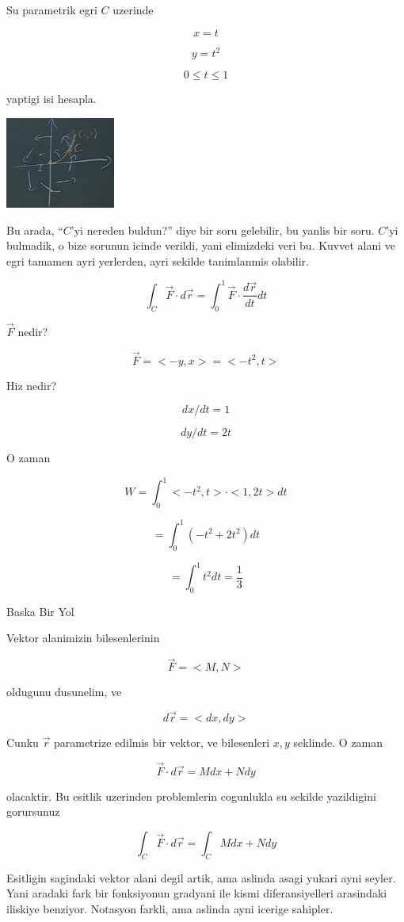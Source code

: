 \documentclass[12pt,fleqn]{article}\usepackage{../common}
\begin{document}
Su parametrik egri $C$ uzerinde

\[ x = t  \]

\[ y = t^2 \]

\[ 0 \le t \le 1 \]

yaptigi isi hesapla. 

\includegraphics[height=3cm]{19_10.png}

Bu arada, ``$C$'yi nereden buldun?'' diye bir soru gelebilir, bu yanlis bir
soru. $C$'yi bulmadik, o bize sorunun icinde verildi, yani elimizdeki veri
bu. Kuvvet alani ve egri tamamen ayri yerlerden, ayri sekilde tanimlanmis
olabilir. 

\[ \int_C \vec{F} \cdot d\vec{r} 
= \int_{0}^{1} \vec{F} \cdot \frac{d\vec{r}}{dt} dt 
\]

$\vec{F}$ nedir? 

\[ \vec{F} = <-y,x> = <-t^2,t> \]

Hiz nedir? 

\[ dx/dt = 1 \]

\[ dy/dt = 2t \]

O zaman 

\[ W = \int_{0}^{1}  <-t^2,t>\cdot<1,2t>dt \]

\[ = \int_{0}^{1} (-t^2 + 2t^2)dt\]

\[ = \int_{0}^{1} t^2dt = \frac{1}{3} \]


Baska Bir Yol

Vektor alanimizin bilesenlerinin

\[ \vec{F} = <M,N> \]

oldugunu dusunelim, ve

\[ d\vec{r} = <dx, dy> \]

Cunku $\vec{r}$ parametrize edilmis bir vektor, ve bilesenleri $x,y$
seklinde. O zaman

\[  \vec{F} \cdot d\vec{r}  = M dx + N dy
\]

olacaktir. Bu esitlik uzerinden problemlerin cogunlukla su sekilde
yazildigini gorursunuz

\[  \int_C \vec{F} \cdot d\vec{r}  = \int_C M dx + N dy\]

Esitligin sagindaki vektor alani degil artik, ama aslinda asagi yukari ayni
seyler. Yani aradaki fark bir fonksiyonun gradyani ile kismi
diferansiyelleri arasindaki iliskiye benziyor. Notasyon farkli, ama aslinda
ayni icerige sahipler. 
\end{document}
